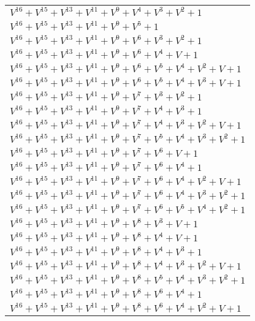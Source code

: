 \documentclass[12pt]{article}
\begin{document}
\begin{adjustwidth}{-4cm}{}
\begin{center}
\begin{longtable}{|l|}
$V^{16}  +V^{15}  +V^{13}  +V^{11}  +V^{9}  +V^{4}  +V^{3}  +V^{2}  + 1$ \\
$V^{16}  +V^{15}  +V^{13}  +V^{11}  +V^{9}  +V^{5}  + 1$ \\
$V^{16}  +V^{15}  +V^{13}  +V^{11}  +V^{9}  +V^{6}  +V^{3}  +V^{2}  + 1$ \\
$V^{16}  +V^{15}  +V^{13}  +V^{11}  +V^{9}  +V^{6}  +V^{4}  + V + 1$ \\
$V^{16}  +V^{15}  +V^{13}  +V^{11}  +V^{9}  +V^{6}  +V^{5}  +V^{4}  +V^{2}  + V + 1$ \\
$V^{16}  +V^{15}  +V^{13}  +V^{11}  +V^{9}  +V^{6}  +V^{5}  +V^{4}  +V^{3}  + V + 1$ \\
$V^{16}  +V^{15}  +V^{13}  +V^{11}  +V^{9}  +V^{7}  +V^{3}  +V^{2}  + 1$ \\
$V^{16}  +V^{15}  +V^{13}  +V^{11}  +V^{9}  +V^{7}  +V^{4}  +V^{3}  + 1$ \\
$V^{16}  +V^{15}  +V^{13}  +V^{11}  +V^{9}  +V^{7}  +V^{4}  +V^{3}  +V^{2}  + V + 1$ \\
$V^{16}  +V^{15}  +V^{13}  +V^{11}  +V^{9}  +V^{7}  +V^{5}  +V^{4}  +V^{3}  +V^{2}  + 1$ \\
$V^{16}  +V^{15}  +V^{13}  +V^{11}  +V^{9}  +V^{7}  +V^{6}  + V + 1$ \\
$V^{16}  +V^{15}  +V^{13}  +V^{11}  +V^{9}  +V^{7}  +V^{6}  +V^{4}  + 1$ \\
$V^{16}  +V^{15}  +V^{13}  +V^{11}  +V^{9}  +V^{7}  +V^{6}  +V^{4}  +V^{2}  + V + 1$ \\
$V^{16}  +V^{15}  +V^{13}  +V^{11}  +V^{9}  +V^{7}  +V^{6}  +V^{4}  +V^{3}  +V^{2}  + 1$ \\
$V^{16}  +V^{15}  +V^{13}  +V^{11}  +V^{9}  +V^{7}  +V^{6}  +V^{5}  +V^{4}  +V^{2}  + 1$ \\
$V^{16}  +V^{15}  +V^{13}  +V^{11}  +V^{9}  +V^{8}  +V^{3}  + V + 1$ \\
$V^{16}  +V^{15}  +V^{13}  +V^{11}  +V^{9}  +V^{8}  +V^{4}  + V + 1$ \\
$V^{16}  +V^{15}  +V^{13}  +V^{11}  +V^{9}  +V^{8}  +V^{4}  +V^{3}  + 1$ \\
$V^{16}  +V^{15}  +V^{13}  +V^{11}  +V^{9}  +V^{8}  +V^{4}  +V^{3}  +V^{2}  + V + 1$ \\
$V^{16}  +V^{15}  +V^{13}  +V^{11}  +V^{9}  +V^{8}  +V^{5}  +V^{4}  +V^{3}  +V^{2}  + 1$ \\
$V^{16}  +V^{15}  +V^{13}  +V^{11}  +V^{9}  +V^{8}  +V^{6}  +V^{4}  + 1$ \\
$V^{16}  +V^{15}  +V^{13}  +V^{11}  +V^{9}  +V^{8}  +V^{6}  +V^{4}  +V^{2}  + V + 1$ \\

\end{longtable}
\end{center}
\end{adjustwidth}
\end{document}
